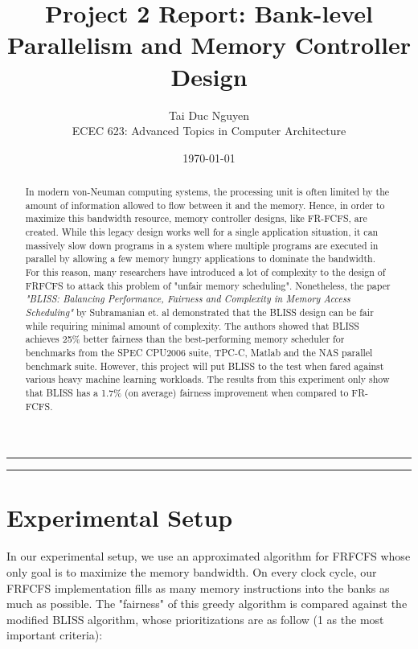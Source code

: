 \documentclass[letterpaper, 11pt]{article}
\title{Project 2 Report: Bank-level Parallelism and Memory Controller Design}
\author{
Tai Duc Nguyen \\
ECEC 623: Advanced Topics in Computer Architecture
}
\date{\today}
\begin{document}
\maketitle



\rule{\textwidth}{1pt}

\begin{abstract}
	In modern von-Neuman computing systems, the processing unit is often limited by the amount of information allowed to flow between it and the memory. Hence, in order to maximize this bandwidth resource, memory controller designs, like FR-FCFS, are created. While this legacy design works well for a single application situation, it can massively slow down programs in a system where multiple programs are executed in parallel by allowing a few memory hungry applications to dominate the bandwidth. For this reason, many researchers have introduced a lot of complexity to the design of FRFCFS to attack this problem of "unfair memory scheduling". Nonetheless, the paper \textit{"BLISS: Balancing Performance, Fairness and Complexity in Memory Access Scheduling"} by Subramanian et. al demonstrated that the BLISS design can be fair while requiring minimal amount of complexity. The authors showed that BLISS achieves 25\% better fairness than the best-performing memory scheduler for benchmarks from the SPEC CPU2006 suite, TPC-C, Matlab and the NAS parallel benchmark suite. However, this project will put BLISS to the test when fared against various heavy machine learning workloads. The results from this experiment only show that BLISS has a 1.7\% (on average) fairness improvement when compared to FR-FCFS.
\end{abstract}

\rule{\textwidth}{1pt}

\section{Experimental Setup}

In our experimental setup, we use an approximated algorithm for FRFCFS whose only goal is to maximize the memory bandwidth. On every clock cycle, our FRFCFS implementation fills as many memory instructions into the banks as much as possible. The "fairness" of this greedy algorithm is compared against the modified BLISS algorithm, whose prioritizations are as follow (1 as the most important criteria):
\end{document}
